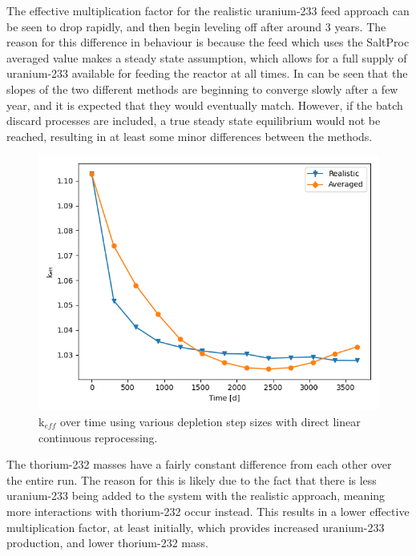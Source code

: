 The effective multiplication factor for the realistic uranium-233 feed approach can be seen to drop rapidly, and then begin leveling off after around 3 years. The reason for this difference in behaviour is because the feed which uses the SaltProc averaged value makes a steady state assumption, which allows for a full supply of uranium-233 available for feeding the reactor at all times. In can be seen that the slopes of the two different methods are beginning to converge slowly after a few year, and it is expected that they would eventually match. However, if the batch discard processes are included, a true steady state equilibrium would not be reached, resulting in at least some minor differences between the methods.

\begin{figure}[H]
  \centering
  \includegraphics[scale=0.5]{images/adv-keff.png}
  \caption{k$_{eff}$ over time using various depletion step sizes with direct linear continuous reprocessing.}
   \label{fig:DL-cont-k-adv}
\end{figure}

The thorium-232 masses have a fairly constant difference from each other over the entire run. The reason for this is likely due to the fact that there is less uranium-233 being added to the system with the realistic approach, meaning more interactions with thorium-232 occur instead. This results in a lower effective multiplication factor, at least initially, which provides increased uranium-233 production, and lower thorium-232 mass.

